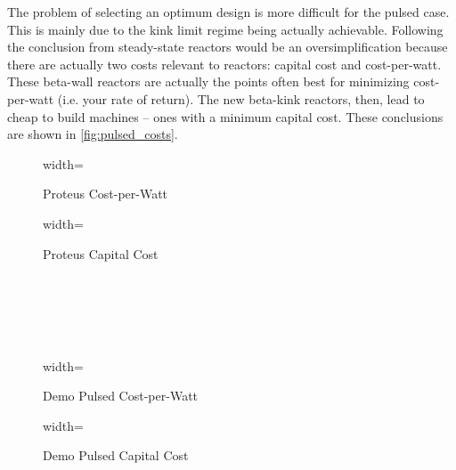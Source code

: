 The problem of selecting an optimum design is more difficult for the pulsed case. This is mainly due to the kink limit regime being actually achievable. Following the conclusion from steady-state reactors would be an oversimplification because there are actually two costs relevant to reactors: capital cost and cost-per-watt. These beta-wall reactors are actually the points often best for minimizing cost-per-watt (i.e. your rate of return). The new beta-kink reactors, then, lead to cheap to build machines -- ones with a minimum capital cost. These conclusions are shown in \cref{fig:pulsed_costs}.

\begin{figure*}
    \centering
    \hfill 
    \begin{subfigure}[t]{0.45\textwidth}
        \centering
		\begin{adjustbox}{width=\textwidth}
			\Large
			
		\end{adjustbox}
        \caption{Proteus Cost-per-Watt}
    \end{subfigure}
    \hfill
    \begin{subfigure}[t]{0.45\textwidth}
        \centering
		\begin{adjustbox}{width=\textwidth}
			\Large
			
		\end{adjustbox}
        \caption{Proteus Capital Cost}
    \end{subfigure}
    \hfill \hfill ~\\ ~\\ ~\\ ~\\
    \hfill 
    \begin{subfigure}[t]{0.45\textwidth}
        \centering
		\begin{adjustbox}{width=\textwidth}
			\Large
			
		\end{adjustbox}
        \caption{Demo Pulsed Cost-per-Watt}
    \end{subfigure}
    \hfill
    \begin{subfigure}[t]{0.45\textwidth}
        \centering
		\begin{adjustbox}{width=\textwidth}
			\Large
			
		\end{adjustbox}
        \caption{Demo Pulsed Capital Cost}
    \end{subfigure}	
    \hfill \hfill ~\\ ~\\ ~\\
    \caption{Pulsed Cost Curves}
    \label{fig:pulsed_costs}
\end{figure*}

